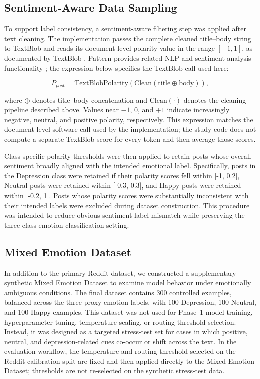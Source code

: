 \documentclass{ieeeaccess}
\begin{document}
\subsection{Sentiment-Aware Data Sampling}

To support label consistency, a sentiment-aware filtering step was applied after text cleaning. The implementation passes the complete cleaned title--body string to TextBlob and reads its document-level polarity value in the range $[-1,1]$, as documented by TextBlob \cite{ref41}. Pattern provides related NLP and sentiment-analysis functionality \cite{ref42}; the expression below specifies the TextBlob call used here:

\begin{equation}
P_{post}=\mathrm{TextBlobPolarity}\!\left(\mathrm{Clean}(\mathrm{title}\oplus\mathrm{body})\right),
\label{eq:post-polarity}
\end{equation}

where $\oplus$ denotes title--body concatenation and $\mathrm{Clean}(\cdot)$ denotes the cleaning pipeline described above. Values near $-1$, $0$, and $+1$ indicate increasingly negative, neutral, and positive polarity, respectively. This expression matches the document-level software call used by the implementation; the study code does not compute a separate TextBlob score for every token and then average those scores.

Class-specific polarity thresholds were then applied to retain posts whose overall sentiment broadly aligned with the intended emotional label. Specifically, posts in the Depression class were retained if their polarity scores fell within [-1, 0.2], Neutral posts were retained within [-0.3, 0.3], and Happy posts were retained within [-0.2, 1]. Posts whose polarity scores were substantially inconsistent with their intended labels were excluded during dataset construction. This procedure was intended to reduce obvious sentiment-label mismatch while preserving the three-class emotion classification setting.

\subsection{Mixed Emotion Dataset}

In addition to the primary Reddit dataset, we constructed a supplementary synthetic Mixed Emotion Dataset to examine model behavior under emotionally ambiguous conditions. The final dataset contains 300 controlled examples, balanced across the three proxy emotion labels, with 100 Depression, 100 Neutral, and 100 Happy examples. This dataset was not used for Phase~1 model training, hyperparameter tuning, temperature scaling, or routing-threshold selection. Instead, it was designed as a targeted stress-test set for cases in which positive, neutral, and depression-related cues co-occur or shift across the text. In the evaluation workflow, the temperature and routing threshold selected on the Reddit calibration split are fixed and then applied directly to the Mixed Emotion Dataset; thresholds are not re-selected on the synthetic stress-test data.
\end{document}
